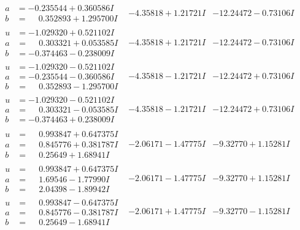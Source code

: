 \documentclass[1p]{elsarticle_modified}
\theoremstyle{definition}
\begin{document}
$$\begin{array}{c|c|c}
\begin{aligned}
a &= -0.235544 + 0.360586 I \\
b &= \phantom{-}0.352893 + 1.295700 I\end{aligned}
 & -4.35818 + 1.21721 I & -12.24472 - 0.73106 I \\ \hline\begin{aligned}
u &= -1.029320 + 0.521102 I \\
a &= \phantom{-}0.303321 + 0.053585 I \\
b &= -0.374463 - 0.238009 I\end{aligned}
 & -4.35818 + 1.21721 I & -12.24472 - 0.73106 I \\ \hline\begin{aligned}
u &= -1.029320 - 0.521102 I \\
a &= -0.235544 - 0.360586 I \\
b &= \phantom{-}0.352893 - 1.295700 I\end{aligned}
 & -4.35818 - 1.21721 I & -12.24472 + 0.73106 I \\ \hline\begin{aligned}
u &= -1.029320 - 0.521102 I \\
a &= \phantom{-}0.303321 - 0.053585 I \\
b &= -0.374463 + 0.238009 I\end{aligned}
 & -4.35818 - 1.21721 I & -12.24472 + 0.73106 I \\ \hline\begin{aligned}
u &= \phantom{-}0.993847 + 0.647375 I \\
a &= \phantom{-}0.845776 + 0.381787 I \\
b &= \phantom{-}0.25649 + 1.68941 I\end{aligned}
 & -2.06171 - 1.47775 I & -9.32770 + 1.15281 I \\ \hline\begin{aligned}
u &= \phantom{-}0.993847 + 0.647375 I \\
a &= \phantom{-}1.69546 - 1.77990 I \\
b &= \phantom{-}2.04398 - 1.89942 I\end{aligned}
 & -2.06171 - 1.47775 I & -9.32770 + 1.15281 I \\ \hline\begin{aligned}
u &= \phantom{-}0.993847 - 0.647375 I \\
a &= \phantom{-}0.845776 - 0.381787 I \\
b &= \phantom{-}0.25649 - 1.68941 I\end{aligned}
 & -2.06171 + 1.47775 I & -9.32770 - 1.15281 I \\ \hline\begin{aligned}

\end{aligned}
\end{array}$$
\end{document}
